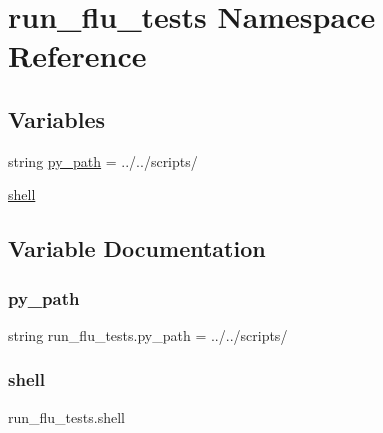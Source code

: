 \hypertarget{namespacerun__flu__tests}{}\section{run\+\_\+flu\+\_\+tests Namespace Reference}
\label{namespacerun__flu__tests}
\subsection*{Variables}
\begin{DoxyCompactItemize}
\item 
string \hyperlink{namespacerun__flu__tests_ada22235ea93c7a9985c7c2c988769fbf}{py\+\_\+path} = \textquotesingle{}../../scripts/\textquotesingle{}
\item 
\hyperlink{namespacerun__flu__tests_a9be8cc070fc30f4e6b790d1eabd14114}{shell}
\end{DoxyCompactItemize}


\subsection{Variable Documentation}
\mbox{\label{namespacerun__flu__tests_ada22235ea93c7a9985c7c2c988769fbf}} 
\subsubsection{\texorpdfstring{py\+\_\+path}{py\_path}}
{\footnotesize\ttfamily string run\+\_\+flu\+\_\+tests.\+py\+\_\+path = \textquotesingle{}../../scripts/\textquotesingle{}}

\mbox{\label{namespacerun__flu__tests_a9be8cc070fc30f4e6b790d1eabd14114}} 
\subsubsection{\texorpdfstring{shell}{shell}}
{\footnotesize\ttfamily run\+\_\+flu\+\_\+tests.\+shell}

